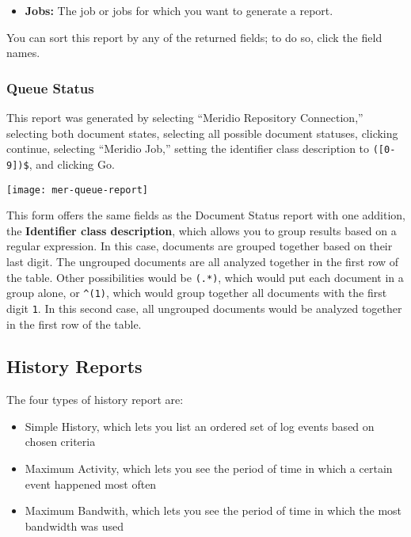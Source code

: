\begin{changemargin}{1.5in}{0in}
\begin{itemize}
\item \textbf{Jobs:} The job or jobs for which you want to generate
a report.

\end{itemize}

You can sort this report by any of the returned fields; to do so,
click the field names.

\subsubsection{Queue Status}

This report was generated by selecting ``Meridio Repository
Connection,'' selecting both document states, selecting all possible
document statuses, clicking continue, selecting ``Meridio Job,''
setting the identifier class description to \texttt{([0-9])\$}, and
clicking Go.

\texttt{[image: mer-queue-report]}

This form offers the same fields as the Document Status report with
one addition, the \textbf{Identifier class description}, which allows
you to group results based on a regular expression. In this case,
documents are grouped together based on their last digit. The
ungrouped documents are all analyzed together in the first row of the
table. Other possibilities would be \texttt{(.*)}, which would put
each document in a group alone, or \texttt{\^{}(1)}, which would group
together all documents with the first digit \texttt{1}.  In this
second case, all ungrouped documents would be analyzed together in the
first row of the table.

\subsection{History Reports}

The four types of history report are:

\begin{itemize}

\item Simple History, which lets you list an ordered set of log events
based on chosen criteria

\item Maximum Activity, which lets you see the period of time in
which a certain event happened most often

\item Maximum Bandwith, which lets you see the period of time in
which the most bandwidth was used 


\end{itemize}
\end{changemargin}
